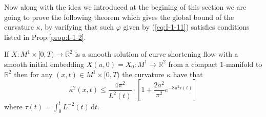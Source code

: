 Now along with the idea we introduced at the begining of this section we are going to prove the following theorem which gives the global bound of the curvature $\kappa$, by varifying that such $\varphi$ given by (\ref{eq:I-1-11}) satisfies conditions listed in Prop.\ref{prop:I-1-2}.
\begin{theorem}\label{thm:I-1-1}
    If $X:M^1\times[0,T)\to\mathbb{R}^2$ is a smooth solution of curve shortening flow with a smooth initial embedding $X(u,0)=X_0:M^1\to\mathbb{R}^2$ from a compact $1$-manifold to $\mathbb{R}^2$ then for any $(x,t)\in M^1\times [0,T)$ the curvature $\kappa$ have that
    \begin{equation}
        \kappa^2(x,t)\le\frac{4\pi^2}{L^2(t)}\cdot\left[1+\frac{2a^2}{\pi^2}e^{-8\pi^2\tau{(t)}}\right]
    \end{equation}
    where $\tau(t)=\int_{0}^{t}L^{-2}(t)\,\mathrm{d}t$.
\end{theorem}
